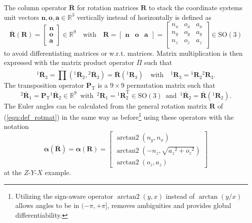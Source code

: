 \documentclass[robotics,article,submit,moreauthors,pdftex]{Definitions/mdpi}
\newcommand{\bm}[1]{\boldsymbol{#1}}
\DeclareMathOperator{\arctantwo}{arctan2}
\newcommand{\rotmat}[2]{{{ }^{#1}\boldsymbol{R}}_{#2}}
\newcommand{\rotmato}[2]{{{ }^{#1}\boldsymbol{\overline{R}}}_{#2}}
\newcommand{\transp}[0]{{\mathrm{T}}}
\begin{document}
The column operator $\overline{\bm{R}}$ for rotation matrices $\bm{R}$ to stack the coordinate systems unit vectors $\bm{n},\bm{o},\bm{a} \in {\mathbb{R}}^{3}$ vertically instead of horizontally is defined as
%
\begin{equation}
\overline{\bm{R}}(\bm{R})=\begin{bmatrix}
\bm{n} \\ \bm{o} \\ \bm{a}
\end{bmatrix} \in {\mathbb{R}}^{9}
\quad
\mathrm{with}
\quad
\bm{R}=\begin{bmatrix}
\bm{n} & \bm{o} & \bm{a}
\end{bmatrix}
=
\begin{bmatrix}
{n_x}&{o_x}&{a_x} \\
{n_y}&{o_y}&{a_y} \\ 
{n_z}&{o_z}&{a_z} \\ 
\end{bmatrix}
\in \mathrm{SO}(3)
\label{equ:def_rotmat}
\end{equation}
%
to avoid differentiating matrices or w.r.t. matrices.
Matrix multiplication is then expressed with the matrix product operator $\overline{\Pi}$
%
such that
%
\begin{equation}
\rotmato{1}{3}
=
\overline{\prod}\left( \rotmato{1}{2}, \rotmato{2}{3}\right)
=
\overline{\bm{R}}(\rotmat{1}{3})
\quad
\mathrm{with}
\quad
\rotmat{1}{3}
=
\rotmat{1}{2}
\rotmat{2}{3}.
\label{equ:matprod}
\end{equation}
%
The transposition operator $\bm{P}_\transp$ is a $9 \times 9$ permutation matrix such that
%
\begin{equation}
\rotmato{2}{1}
=
\bm{P}_\transp \rotmato{1}{2}
\in {\mathbb{R}}^{9}
\enspace
\mathrm{with}
\enspace
\rotmat{2}{1}
=
\rotmat{1}{2}^\transp
\in \mathrm{SO}(3)
\enspace
\mathrm{and}
\enspace
\rotmato{1}{2}=\overline{\bm{R}}(\rotmat{1}{2})
.
\end{equation}
%
The Euler angles can be calculated from the general rotation matrix $\bm{R}$ of (\ref{equ:def_rotmat}) in the same way as before\footnote{Utilizing the sign-aware operator $\arctantwo(y,x)$ instead of $\arctan(y/x)$ allows angles to be in $(-\pi,+\pi]$, removes ambiguities and provides global differentiability.} using these operators with the notation
%
\begin{equation}
\bm{\alpha}(\overline{\bm{R}})
=
\bm{\alpha}(\bm{R})
=
\begin{bmatrix}
\arctantwo \left( {n_y} , { n_x} \right) \\ 
\arctantwo \left( -{n_z} , \sqrt {{{a_z}}^{2}+{{ o_z}}^{2}} \right) \\ 
\arctantwo \left( {o_z} , {a_z} \right)
\end{bmatrix}
\label{equ:alpha_def_rotmat_zyx}
\end{equation}
%
at the $Z$-$Y$-$X$ example.
\end{document}
